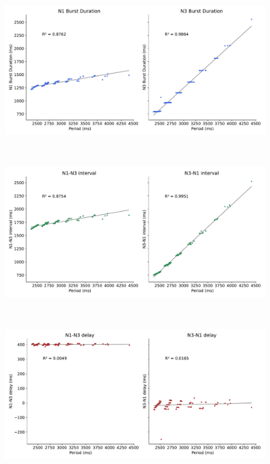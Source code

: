 \begin{figure}[hbt!]
\begin{minipage}[b]{0.53\textwidth}
\begin{minipage}[b]{\textwidth}
		\end{minipage}
	\end{minipage}
	\begin{minipage}[b]{0.45\textwidth}
		\centering
		\begin{minipage}[b]{\textwidth}
			\centering
			\includegraphics[width=\textwidth]{invariants/data/MODEL/n1m_driven/images/2phases/_durations.pdf}
		\end{minipage}\
		\begin{minipage}[b]{\textwidth}
			\centering
			\includegraphics[width=\textwidth]{invariants/data/MODEL/n1m_driven/images/2phases/_intervals.pdf}
		\end{minipage}\
		\begin{minipage}[b]{\textwidth}
			\centering
			\includegraphics[width=\textwidth]{invariants/data/MODEL/n1m_driven/images/2phases/_delays.pdf}
		\end{minipage}
	

\end{minipage}
\end{figure}
